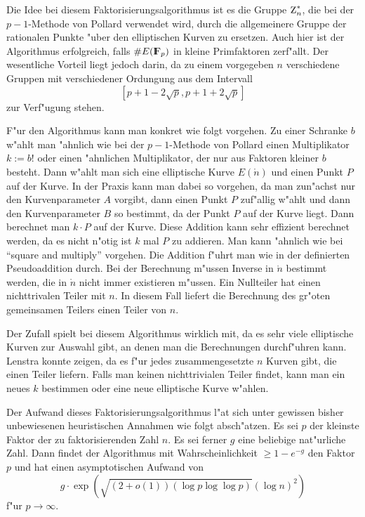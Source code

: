 Die Idee bei diesem Faktorisierungsalgorithmus ist es die Gruppe
$\einheit{n}$, die bei der $p-1$-Methode von Pollard verwendet wird,
durch die allgemeinere Gruppe der rationalen Punkte "uber den
elliptischen Kurven zu ersetzen. Auch hier ist der Algorithmus
erfolgreich, falls $\# E(\F_p)$ in kleine Primfaktoren zerf"allt. Der
wesentliche Vorteil liegt jedoch darin, da\3 zu einem vorgegeben $n$
verschiedene Gruppen mit verschiedener Ordungung aus dem Intervall
$$ \left[ p+1-2\sqrt{p},p+1+2\sqrt{p} \right] $$
zur Verf"ugung stehen. 

F"ur den Algorithmus kann man konkret wie folgt vorgehen. Zu einer
Schranke $b$ w"ahlt man "ahnlich wie bei der $p-1$-Methode von Pollard
einen Multiplikator $k:=b!$ oder einen "ahnlichen Multiplikator, der
nur aus Faktoren kleiner $b$ besteht. Dann w"ahlt man sich eine
elliptische Kurve $E(\ring{n})$ und einen Punkt $P$ auf der Kurve. In
der Praxis kann man dabei so vorgehen, da\3 man zun"achst nur den
Kurvenparameter $A$ vorgibt, dann einen Punkt $P$ zuf"allig w"ahlt und
dann den Kurvenparameter $B$ so bestimmt, da\3 der Punkt $P$ auf der
Kurve liegt. Dann berechnet man $k\cdot P$ auf der Kurve. Diese
Addition kann sehr effizient berechnet werden, da es nicht n"otig ist
$k$ mal $P$ zu addieren. Man kann "ahnlich wie bei "`square and
multiply"' vorgehen.  Die Addition f"uhrt man wie in der
definierten Pseudoaddition durch. Bei der Berechnung m"ussen Inverse
in $\ring{n}$ bestimmt werden, die in $\ring{n}$ nicht immer
existieren m"ussen. Ein Nullteiler hat einen nichttrivalen Teiler mit $n$. 
In diesem Fall liefert die Berechnung des gr"o\3ten gemeinsamen Teilers einen
Teiler von $n$.

Der Zufall spielt bei diesem Algorithmus wirklich mit, da es sehr viele
elliptische Kurven zur Auswahl gibt, an denen man die Berechnungen
durchf"uhren kann.  Lenstra konnte zeigen, da\3 es f"ur jedes
zusammengesetzte $n$ Kurven gibt, die einen Teiler liefern. Falls man
keinen nichttrivialen Teiler findet, kann man ein neues $k$ bestimmen
oder eine neue elliptische Kurve w"ahlen.

Der Aufwand dieses Faktorisierungsalgorithmus l"a\3t sich unter
gewissen bisher unbewiesenen heuristischen Annahmen wie folgt
absch"atzen. Es sei $p$ der kleinste Faktor der zu faktorisierenden
Zahl $n$. Es sei ferner $g$ eine beliebige nat"urliche Zahl. Dann
findet der Algorithmus mit Wahrscheinlichkeit $ \ge 1-e^{-g}$ den
Faktor $p$ und hat einen asymptotischen Aufwand von
$$ g \cdot \exp\left({\sqrt{(2+o(1))(\log p\log\log p)}} \left(\log n\right)^2\right) $$
f"ur $p\rightarrow \infty $.

